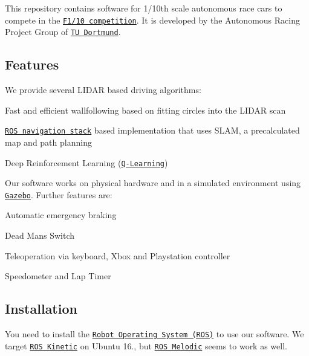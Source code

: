 \href{https://travis-ci.com/Autonomous-Racing-PG/ros.package}{\tt }

This repository contains software for 1/10th scale autonomous race cars to compete in the \href{http://f1tenth.org/}{\tt F1/10 competition}. It is developed by the Autonomous Racing Project Group of \href{https://ls12-www.cs.tu-dortmund.de/daes/}{\tt TU Dortmund}.



\subsection*{Features}

We provide several L\+I\+D\+AR based driving algorithms\+:


\begin{DoxyItemize}
\item Fast and efficient wallfollowing based on fitting circles into the L\+I\+D\+AR scan
\item \href{http://wiki.ros.org/navigation}{\tt R\+OS navigation stack} based implementation that uses S\+L\+AM, a precalculated map and path planning
\item Deep Reinforcement Learning (\href{https://en.wikipedia.org/wiki/Q-learning}{\tt Q-\/\+Learning})
\end{DoxyItemize}

Our software works on physical hardware and in a simulated environment using \href{http://gazebosim.org/}{\tt Gazebo}. Further features are\+:


\begin{DoxyItemize}
\item Automatic emergency braking
\item Dead Man\textquotesingle{}s Switch
\item Teleoperation via keyboard, Xbox and Playstation controller
\item Speedometer and Lap Timer
\end{DoxyItemize}

\subsection*{Installation}

You need to install the \href{https://www.ros.org/}{\tt Robot Operating System (R\+OS)} to use our software. We target \href{http://wiki.ros.org/kinetic/Installation}{\tt R\+OS Kinetic} on Ubuntu 16., but \href{http://wiki.ros.org/melodic/Installation}{\tt R\+OS Melodic} seems to work as well.

